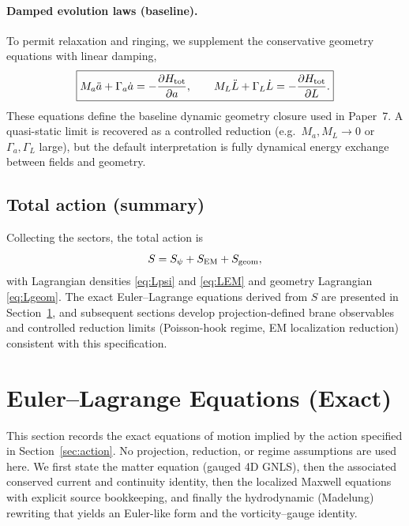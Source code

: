 \documentclass[11pt]{article}
\begin{document}
\paragraph{Damped evolution laws (baseline).}
To permit relaxation and ringing, we supplement the conservative geometry equations with linear damping,
\begin{equation}
\boxed{
M_a \ddot a + \Gamma_a \dot a = -\frac{\partial H_{\rm tot}}{\partial a},
\qquad
M_L \ddot L + \Gamma_L \dot L = -\frac{\partial H_{\rm tot}}{\partial L}.
}
\label{eq:geom-eom}
\end{equation}
These equations define the baseline dynamic geometry closure used in Paper~7. A quasi-static limit is recovered as a controlled reduction (e.g.\ $M_a,M_L\to 0$ or $\Gamma_a,\Gamma_L$ large), but the default interpretation is fully dynamical energy exchange between fields and geometry.

\subsection{Total action (summary)}
\label{sec:action-total}

Collecting the sectors, the total action is
\begin{equation}
S = S_\psi + S_{\rm EM} + S_{\rm geom},
\end{equation}
with Lagrangian densities \eqref{eq:Lpsi} and \eqref{eq:LEM} and geometry Lagrangian \eqref{eq:Lgeom}. The exact Euler--Lagrange equations derived from $S$ are presented in Section~\ref{sec:eom}, and subsequent sections develop projection-defined brane observables and controlled reduction limits (Poisson-hook regime, EM localization reduction) consistent with this specification.

\section{Euler--Lagrange Equations (Exact)}
\label{sec:eom}

This section records the exact equations of motion implied by the action specified in Section~\ref{sec:action}. No projection, reduction, or regime assumptions are used here. We first state the matter equation (gauged 4D GNLS), then the associated conserved current and continuity identity, then the localized Maxwell equations with explicit source bookkeeping, and finally the hydrodynamic (Madelung) rewriting that yields an Euler-like form and the vorticity--gauge identity.
\end{document}
